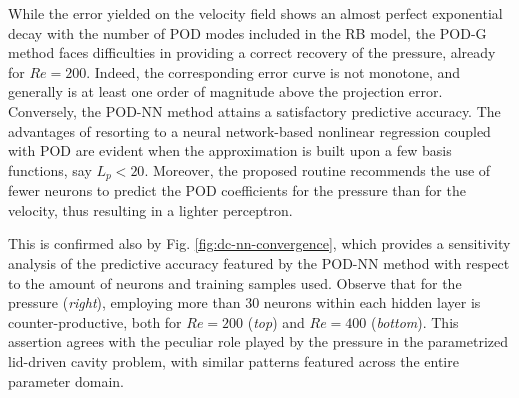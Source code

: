 \documentclass[longtitle]{elsarticle}
\numberwithin{equation}{section}
\theoremstyle{theorem}
\theoremstyle{definition}
\theoremstyle{remark}
\theoremstyle{proposition}
\numberwithin{figure}{section}
\begin{document}
		While the error yielded on the velocity field shows an almost perfect exponential decay with the number of POD modes included in the RB model, the POD-G method faces difficulties in providing a correct recovery of the pressure, already for $Re = 200$. Indeed, the corresponding error curve is not monotone, and generally is at least one order of magnitude above the projection error. Conversely, the POD-NN method attains a satisfactory predictive accuracy. The advantages of resorting to a neural network-based nonlinear regression coupled with POD are evident when the approximation is built upon a few basis functions, say $L_p < 20$. Moreover, the proposed routine recommends the use of fewer neurons to predict the POD coefficients for the pressure than for the velocity, thus resulting in a lighter perceptron. 
		
		This is confirmed also by Fig. \ref{fig:dc-nn-convergence}, which provides a sensitivity analysis of the predictive accuracy featured by the POD-NN method with respect to the amount of neurons and training samples used. Observe that for the pressure (\emph{right}), employing more than $30$ neurons within each hidden layer is counter-productive, both for $Re = 200$ (\emph{top}) and $Re = 400$ (\emph{bottom}). This assertion agrees with the peculiar role played by the pressure in the parametrized lid-driven cavity problem, with similar patterns featured across the entire parameter domain. 
		
\end{document}
